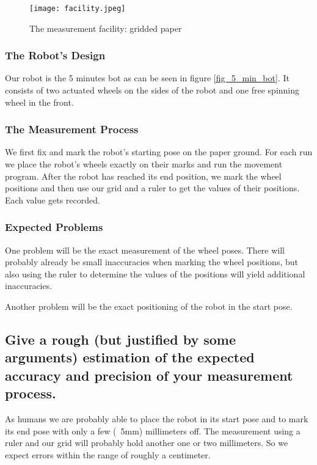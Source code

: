 \documentclass[paper=a4, fontsize=11pt]{scrartcl} %
\numberwithin{equation}{section} %
\numberwithin{figure}{section} %
\numberwithin{table}{section} %
\begin{document}
\begin{figure}[ht]
	\centering
  \texttt{[image: facility.jpeg]}
	\caption{The measurement facility: gridded paper}
	\label{fig_facility}
\end{figure}
\subsubsection{The Robot's Design}
Our robot is the 5 minutes bot as can be seen in figure \ref{fig_5_min_bot}.
It consists of two actuated wheels on the sides of the robot and one free spinning wheel in the front.

\subsubsection{The Measurement Process}
We first fix and mark the robot's starting pose on the paper ground.
For each run we place the robot's wheels exactly on their marks and run the movement program.
After the robot has reached its end position, we mark the wheel positions and then use our grid and a ruler to get the values of their positions.
Each value gets recorded.

\subsubsection{Expected Problems}
One problem will be the exact measurement of the wheel poses. 
There will probably already be small inaccuracies when marking the wheel positions, but also using the ruler to determine the values of the positions will yield additional inaccuracies.

Another problem will be the exact positioning of the robot in the start pose.

\subsection{Give a rough (but justified by some arguments) estimation of the expected accuracy and precision of your measurement process.}
As humans we are probably able to place the robot in its start pose and to mark its end pose with only a few (~5mm) millimeters off. The measurement using a ruler and our grid will probably hold another one or two millimeters. 
So we expect errors within the range of roughly a centimeter.
\end{document}
